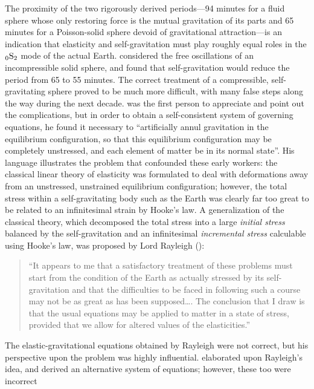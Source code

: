 The proximity of the two rigorously derived periods---94 minutes for
a fluid sphere whose only restoring force is the mutual gravitation
of its parts and 65 minutes for a Poisson-solid sphere devoid of gravitational
attraction---is an indication that elasticity and self-gravitation must
play roughly equal roles in the ${}_0{\rm S}_2$ mode of the actual Earth.
\textcite{bromwich98} considered the free oscillations of an incompressible
solid sphere, and found that self-gravitation would reduce
the period from 65 to 55 minutes.  The correct treatment of a compressible,
self-gravitating sphere proved to be much more difficult, with many false
steps along the way during the next decade.  \textcite{jeans03} was the
first person to appreciate and point out the complications, but in order
to obtain a self-consistent system of governing equations, he found it
necessary to ``artificially annul gravitation in the equilibrium configuration,
so that this equilibrium configuration may be completely unstressed, and
each element of matter be in its normal state''.  His language illustrates
the problem that confounded these early workers: the classical linear theory
of elasticity was formulated to deal with deformations away from an unstressed,
unstrained equilibrium configuration; however, the total stress within a
self-gravitating body such as the Earth was clearly far too great to
be related to an infinitesimal strain by Hooke's law.  A generalization
of the classical theory, which decomposed the total stress
into a large {\em initial stress\/}
%
%
balanced by the self-gravitation and an infinitesimal {\em incremental stress\/}
%
%
calculable using Hooke's law, was proposed by Lord
Rayleigh (\citeyear{rayleigh06}):
\begin{quote}
``It appears to me that a satisfactory treatment of these problems must start
from the condition of the Earth as actually stressed by its self-gravitation
and that the difficulties to be
faced in following such a course may not be as
great as has been supposed\ldots.
The conclusion that I draw is that the
usual equations may be applied to matter in a state of stress, provided
that we allow for altered values of the elasticities.''
\end{quote}
The elastic-gravitational equations obtained by Rayleigh were not
correct, but his perspective upon the problem was highly influential.
\textcite{love07} elaborated upon Rayleigh's idea, and derived an
alternative system of equations; however, these too were incorrect
